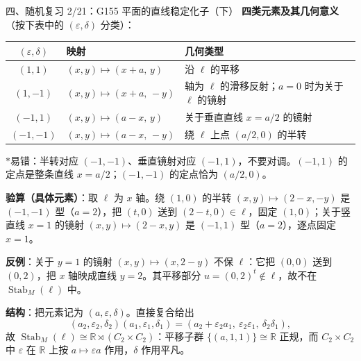 \documentclass[aspectratio=169,10pt,fontset=none]{ctexbeamer}
\newcommand{\key}[1]{\textcolor{ink}{\bfseries #1}}
\newcommand{\starpt}{\textcolor{accent}{\bfseries$\ast$}}
\begin{document}
\begin{frame}[t]{四、随机复习 2/21：G155 平面的直线稳定化子（下）}
\scriptsize
\key{四类元素及其几何意义}（按下表中的 $(\varepsilon,\delta)$ 分类）：
\begin{center}
{\scriptsize
\begin{tabular}{@{}cll@{}}
\toprule
$(\varepsilon,\delta)$ & 映射 & 几何类型\\ \midrule
$(1,1)$ & $(x,y)\mapsto(x+a,\,y)$ & 沿 $\ell$ 的平移\\
$(1,-1)$ & $(x,y)\mapsto(x+a,\,-y)$ & 轴为 $\ell$ 的滑移反射；$a=0$ 时为关于 $\ell$ 的镜射\\
$(-1,1)$ & $(x,y)\mapsto(a-x,\,y)$ & 关于垂直直线 $x=a/2$ 的镜射\\
$(-1,-1)$ & $(x,y)\mapsto(a-x,\,-y)$ & 绕 $\ell$ 上点 $(a/2,0)$ 的半转\\
\bottomrule
\end{tabular}}
\end{center}
\starpt 易错：半转对应 $(-1,-1)$、垂直镜射对应 $(-1,1)$，不要对调。$(-1,1)$ 的定点是整条直线 $x=a/2$；$(-1,-1)$ 的定点恰为 $(a/2,0)$。

\key{验算（具体元素）}：取 $\ell$ 为 $x$ 轴。绕 $(1,0)$ 的半转 $(x,y)\mapsto(2-x,-y)$ 是 $(-1,-1)$ 型（$a=2$），把 $(t,0)$ 送到 $(2-t,0)\in\ell$，固定 $(1,0)$；关于竖直线 $x=1$ 的镜射 $(x,y)\mapsto(2-x,y)$ 是 $(-1,1)$ 型（$a=2$），逐点固定 $x=1$。

\key{反例}：关于 $y=1$ 的镜射 $(x,y)\mapsto(x,2-y)$ 不保 $\ell$：它把 $(0,0)$ 送到 $(0,2)$，把 $x$ 轴映成直线 $y=2$。其平移部分 $u=(0,2)^t\notin\ell$，故不在 $\operatorname{Stab}_M(\ell)$ 中。

\key{结构}：把元素记为 $(a,\varepsilon,\delta)$。直接复合给出
\[ (a_2,\varepsilon_2,\delta_2)(a_1,\varepsilon_1,\delta_1)=(a_2+\varepsilon_2a_1,\ \varepsilon_2\varepsilon_1,\ \delta_2\delta_1), \]
故 $\operatorname{Stab}_M(\ell)\cong\mathbb R\rtimes(C_2\times C_2)$：平移子群 $\{(a,1,1)\}\cong\mathbb R$ 正规，而 $C_2\times C_2$ 中 $\varepsilon$ 在 $\mathbb R$ 上按 $a\mapsto\varepsilon a$ 作用，$\delta$ 作用平凡。
\end{frame}
\end{document}
